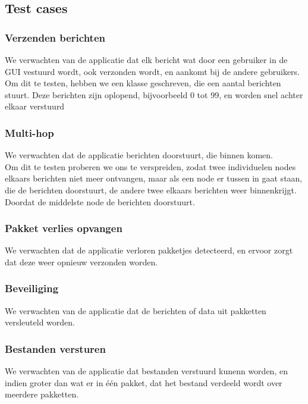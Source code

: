 \documentclass{article}
\begin{document}
\subsection{Test cases}
\subsubsection{Verzenden berichten}
We verwachten van de applicatie dat elk bericht wat door een gebruiker in de GUI vestuurd wordt, ook verzonden wordt, en aankomt bij de andere gebruikers. \\
Om dit te testen, hebben we een klasse geschreven, die een aantal berichten stuurt. Deze berichten zijn oplopend, bijvoorbeeld 0 tot 99, en worden snel achter elkaar verstuurd \\

\subsubsection{Multi-hop}
We verwachten dat de applicatie berichten doorstuurt, die binnen komen. \\
Om dit te testen proberen we ons te verspreiden, zodat twee individuelen nodes elkaars berichten niet meer ontvangen, maar als een node er tussen in gaat staan, die de berichten doorstuurt, de andere twee elkaars berichten weer binnenkrijgt. Doordat de middelste node de berichten doorstuurt. \\
\subsubsection{Pakket verlies opvangen}
We verwachten dat de applicatie verloren pakketjes detecteerd, en ervoor zorgt dat deze weer opnieuw verzonden worden. \\

\subsubsection{Beveiliging}
We verwachten van de applicatie dat de berichten of data uit pakketten versleuteld worden. \\

\subsubsection{Bestanden versturen}
We verwachten van de applicatie dat bestanden verstuurd kunenn worden, en indien groter dan wat er in \'{e}\'{e}n pakket, dat het bestand verdeeld wordt over meerdere pakketten. \\
\end{document}

